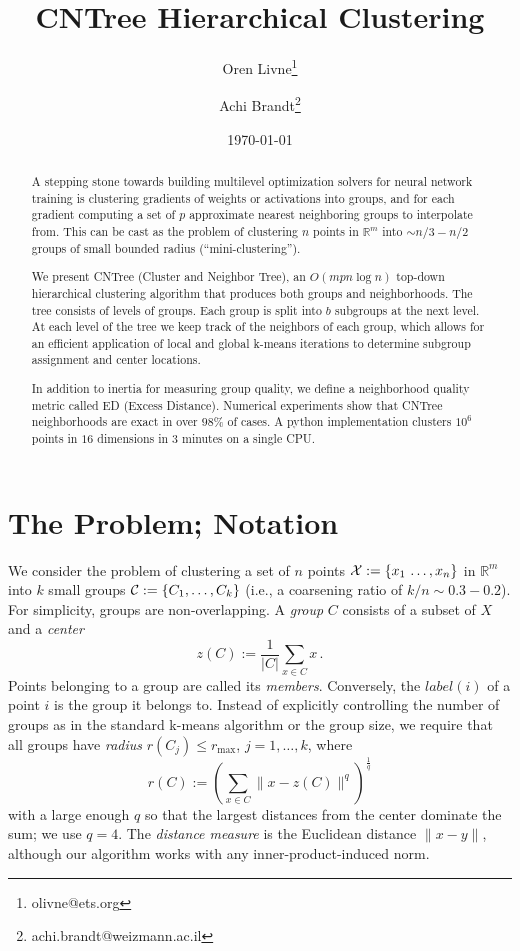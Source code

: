 \documentclass[11pt]{article}
\title{CNTree Hierarchical Clustering}
\author[1]{Oren Livne\thanks{olivne@ets.org}}
\author[2]{Achi Brandt\thanks{achi.brandt@weizmann.ac.il}}
\affil[1]{Educational Testing Service, Attn: MS-12, T-197, 660 Rosedale Road, Princeton, NJ 08540}
\affil[2]{Faculty of Mathematics and Computer Science, The Weizmann Institute of Science, 234 Herzl Street, Rehovot 7610001 Israel}
\date{\today}
\newcommand{\lp}{\left(}
\newcommand{\rp}{\right)}
\newcommand{\lb}{\left\{}
\newcommand{\rb}{\right\}}
\newcommand{\Real}{\mathbb{R}}
\newcommand{\rmax}{r_{\text{max}}}
\newcommand{\cC}{{\cal C}}
\newcommand{\cX}{{\cal X}}
\begin{document}
\maketitle

\begin{abstract}
A stepping stone towards building multilevel optimization solvers for neural network training is clustering gradients of weights or activations into groups, and for each gradient computing a set of $p$ approximate nearest neighboring groups to interpolate from. This can be cast as the problem of clustering $n$ points in $\Real^m$ into $\sim n/3-n/2$ groups of small bounded radius (``mini-clustering'').

We present CNTree (Cluster and Neighbor Tree), an $O(m p n \log n)$ top-down hierarchical clustering algorithm that produces both groups and neighborhoods. The tree consists of levels of groups. Each group is split into $b$ subgroups at the next level. At each level of the tree we keep track of the neighbors of each group, which allows for an efficient application of local and global k-means iterations to determine  subgroup assignment and center locations.

In addition to inertia for measuring group quality, we define a neighborhood quality metric called ED (Excess Distance). Numerical experiments show that CNTree neighborhoods are exact in over $98\%$ of cases. A python implementation clusters $10^6$ points in $16$ dimensions in $3$ minutes on a single CPU.
\end{abstract}

\section{The Problem; Notation}
We consider the problem of clustering a set of $n$ points $\cX := \lb x_1\,\dots,x_n \rb $ in $\Real^m$ into $k$ small groups $\cC :=\lb C_1,\dots,C_k\rb $ (i.e., a coarsening ratio of $k/n \sim 0.3-0.2$). For simplicity, groups are non-overlapping. A {\it group} $C$ consists of a subset of $X$ and a {\it center}
\begin{equation}
	z(C) := \frac{1}{|C|}\sum_{x \in C} x\,.
\end{equation}
Points belonging to a group are called its {\it members}. Conversely, the $label(i)$ of a point $i$ is the group it belongs to. Instead of explicitly controlling the number of groups as in the standard k-means algorithm \cite{Lloyd82leastsquares} or the group size, we require that all groups have {\it radius} $r(C_j) \leq \rmax$, $j=1,\dots,k$, where
\begin{equation}
	r(C) := \lp \sum_{x \in C} \|x - z(C)\|^q \rp^{\frac{1}{q}}
\end{equation}
with a large enough $q$ so that the largest distances from the center dominate the sum; we use $q=4$.
The {\it distance measure} is the Euclidean distance $\|x-y\|$, although our algorithm works with any inner-product-induced norm.
\end{document}
